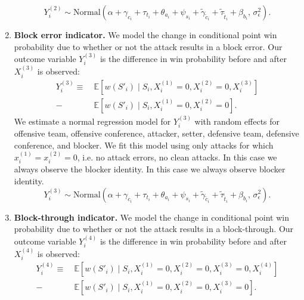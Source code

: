 \documentclass[USenglish]{article}
\theoremstyle{dgthm}
\theoremstyle{dgdef}
\begin{document}
\begin{enumerate}
        \begin{equation}
        \label{eqn:attack-model-2}
            Y_i^{(2)} \sim \mbox{Normal}\left(
                \alpha + \gamma_{c_i} + \tau_{t_i} + \theta_{a_i} + \psi_{s_i} + \tilde\gamma_{\tilde c_i} + \tilde\tau_{\tilde t_i} + \beta_{b_i},\,
                \sigma^2_\epsilon
            \right).
        \end{equation}
    \item
        {\bf Block error indicator.} We model the change in conditional point win probability due to whether or not the attack results in a block error. Our outcome variable $Y_i^{(3)}$ is the difference in win probability before and after $X_i^{(3)}$ is observed:
        \begin{align*}
            Y_i^{(3)} \equiv &~\mathbb{E}\left[w(S'_i) \mid S_i, X_i^{(1)} = 0, X_i^{(2)} = 0, X_i^{(3)}\right]\\
            - &~\mathbb{E}\left[w(S'_i) \mid S_i, X_i^{(1)} = 0, X_i^{(2)} = 0\right].
        \end{align*}
        We estimate a normal regression model for $Y_i^{(3)}$ with random effects for offensive team, offensive conference, attacker, setter, defensive team, defensive conference, and blocker. We fit this model using only attacks for which $x_i^{(1)} = x_i^{(2)} = 0$, i.e. no attack errors, no clean attacks. In this case we always observe the blocker identity. In this case we always observe blocker identity.
        \begin{equation}
        \label{eqn:attack-model-3}
            Y_i^{(3)} \sim \mbox{Normal}\left(
                \alpha + \gamma_{c_i} + \tau_{t_i} + \theta_{a_i} + \psi_{s_i} + \tilde\gamma_{\tilde c_i} + \tilde\tau_{\tilde t_i} + \beta_{b_i},\,
                \sigma^2_\epsilon
            \right).
        \end{equation}
    \item
        {\bf Block-through indicator.} We model the change in conditional point win probability due to whether or not the attack results in a block-through. Our outcome variable $Y_i^{(4)}$ is the difference in win probability before and after $X_i^{(4)}$ is observed:
        \begin{align*}
            Y_i^{(4)} \equiv &~\mathbb{E}\left[w(S'_i) \mid S_i, X_i^{(1)} = 0, X_i^{(2)} = 0, X_i^{(3)} = 0, X_i^{(4)}\right]\\
            - &~\mathbb{E}\left[w(S'_i) \mid S_i, X_i^{(1)} = 0, X_i^{(2)} = 0, X_i^{(3)} = 0\right].
        \end{align*}

\end{enumerate}
\end{document}
